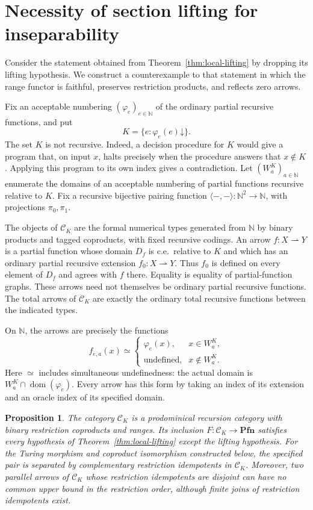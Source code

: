 \documentclass[11pt]{article}
\newtheorem{proposition}[theorem]{Proposition}
\newcommand{\N}{\mathbb N}
\newcommand{\Pfn}{\mathbf{Pfn}}
\begin{document}
\section{Necessity of section lifting for inseparability}
\label{app:lifting-counterexample}

Consider the statement obtained from Theorem~\ref{thm:local-lifting}
by dropping its lifting hypothesis. We construct a counterexample to
that statement in which the range functor is faithful, preserves
restriction products, and reflects zero arrows.

Fix an acceptable numbering $(\varphi_e)_{e\in\N}$ of the ordinary
partial recursive functions, and put
\[
 K=\{e:\varphi_e(e)\mathord\downarrow\}.
\]
The set $K$ is not recursive. Indeed, a decision procedure for $K$
would give a program that, on input $x$, halts precisely when the
procedure answers that $x\notin K$. Applying this program to its own
index gives a contradiction.
Let $(W_a^K)_{a\in\N}$ enumerate the domains of an acceptable
numbering of partial functions recursive relative to $K$.
Fix a recursive bijective pairing function
$\langle-,-\rangle:\N^2\to\N$, with projections $\pi_0,\pi_1$.

The objects of $\mathcal C_K$ are the formal numerical types generated
from $\N$ by binary products and tagged coproducts, with fixed recursive
codings. An arrow $f:X\rightharpoonup Y$ is a partial function whose
domain $D_f$ is c.e.\ relative to $K$ and which has an ordinary partial
recursive extension $f_0:X\rightharpoonup Y$. Thus $f_0$ is defined
on every element of $D_f$ and agrees with $f$ there. Equality is equality
of partial-function graphs. These arrows need not themselves be ordinary
partial recursive functions. The total arrows of $\mathcal C_K$ are exactly
the ordinary total recursive functions between the indicated types.

On $\N$, the arrows are precisely the functions
\[
 f_{e,a}(x)\simeq
 \begin{cases}
  \varphi_e(x),&x\in W_a^K,\\
  \text{undefined},&x\notin W_a^K.
 \end{cases}
\]
Here $\simeq$ includes simultaneous undefinedness: the actual domain
is $W_a^K\cap\operatorname{dom}(\varphi_e)$. Every arrow has this
form by taking an index of its extension and an oracle index of its
specified domain.

\begin{proposition}\label{prop:missing-lift}
The category $\mathcal C_K$ is a prodominical recursion category with
binary restriction coproducts and ranges. Its inclusion
$F:\mathcal C_K\to\Pfn$ satisfies every hypothesis of
Theorem~\ref{thm:local-lifting} except the lifting hypothesis.
For the Turing morphism and coproduct isomorphism constructed below,
the specified pair is separated by complementary restriction idempotents in
$\mathcal C_K$. Moreover, two parallel arrows of $\mathcal C_K$
whose restriction idempotents are disjoint can have no common upper
bound in the restriction order, although finite joins of restriction
idempotents exist.
\end{proposition}
\end{document}
